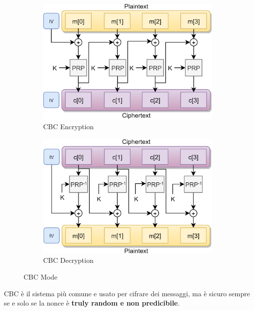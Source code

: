 \begin{figure}[ht]
    \centering
    \begin{subfigure}[b]{0.48\textwidth}
    \includegraphics[width=\textwidth]{image/cbcenc.png}
    \caption{CBC Encryption}
    \label{fig:cbcenc}
    \end{subfigure}\quad
    \begin{subfigure}[b]{0.48\textwidth}
    \includegraphics[width=\textwidth]{image/cbcdec.png}
    \caption{CBC Decryption}
    \label{fig:cbcdec}
    \end{subfigure}
    \caption{CBC Mode}
\end{figure}
\begin{remark}
CBC è il sistema più comune e usato per cifrare dei messaggi, ma è sicuro sempre se e solo se la nonce è \textbf{truly random e non predicibile}.
\end{remark}
